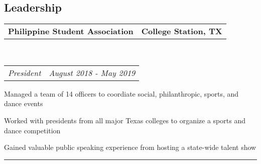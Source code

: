 \documentclass[10pt,letterpaper]{article}
\makeatletter
\newenvironment{indentsection}[1]%
{\begin{list}{}%
	{\setlength{\leftmargin}{#1}}%
	\item[]%
}
{\end{list}}
\newcommand{\headerrow}[2]
{\begin{tabular*}{\linewidth}{l@{\extracolsep{\fill}}r}
	#1 &
	#2 \\
\end{tabular*}}
\makeatother
\begin{document}
\subsection*{Leadership}
\begin{indentsection}{\parindent}
	\vspace{-0.4em}
	\headerrow
		{\textbf{Philippine Student Association}}
		{\textbf{College Station, TX}}
		\\
	\headerrow
		{\emph{President}}
		{\emph{August 2018 - May 2019}}
	\begin{itemize*}
		\item Managed a team of 14 officers to coordiate social, philanthropic, sports, and dance events
		\item Worked with presidents from all major Texas colleges to organize a sports and dance competition 
		\item Gained valuable public speaking experience from hosting a state-wide talent show
	\end{itemize*}

\end{indentsection}
\newif\ifdraft
\draftfalse %

\ifdraft
\hrule
\vspace{-0.8em}
\end{document}
